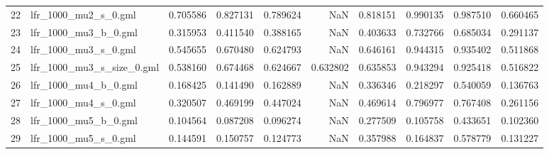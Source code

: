 \begin{tabular}{llrrrrrrrr}
22 &        lfr\_1000\_mu2\_s\_0.gml &                            0.705586 &                       0.827131 &                          0.789624 &                           NaN &                        0.818151 &                     0.990135 &                            0.987510 &                                0.660465 \\
23 &        lfr\_1000\_mu3\_b\_0.gml &                            0.315953 &                       0.411540 &                          0.388165 &                           NaN &                        0.403633 &                     0.732766 &                            0.685034 &                                0.291137 \\
24 &        lfr\_1000\_mu3\_s\_0.gml &                            0.545655 &                       0.670480 &                          0.624793 &                           NaN &                        0.646161 &                     0.944315 &                            0.935402 &                                0.511868 \\
25 &   lfr\_1000\_mu3\_s\_size\_0.gml &                            0.538160 &                       0.674468 &                          0.624667 &                      0.632802 &                        0.635853 &                     0.943294 &                            0.925418 &                                0.516822 \\
26 &        lfr\_1000\_mu4\_b\_0.gml &                            0.168425 &                       0.141490 &                          0.162889 &                           NaN &                        0.336346 &                     0.218297 &                            0.540059 &                                0.136763 \\
27 &        lfr\_1000\_mu4\_s\_0.gml &                            0.320507 &                       0.469199 &                          0.447024 &                           NaN &                        0.469614 &                     0.796977 &                            0.767408 &                                0.261156 \\
28 &        lfr\_1000\_mu5\_b\_0.gml &                            0.104564 &                       0.087208 &                          0.096274 &                           NaN &                        0.277509 &                     0.105758 &                            0.433651 &                                0.102360 \\
29 &        lfr\_1000\_mu5\_s\_0.gml &                            0.144591 &                       0.150757 &                          0.124773 &                           NaN &                        0.357988 &                     0.164837 &                            0.578779 &                                0.131227 \\

\end{tabular}
